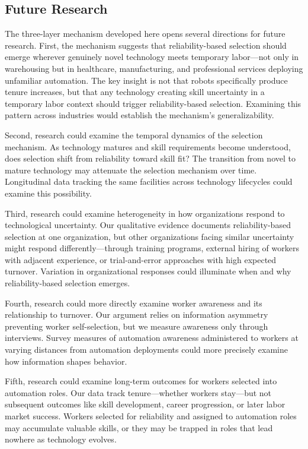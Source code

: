 \documentclass[12pt]{article}
\begin{document}
\subsection{Future Research}

The three-layer mechanism developed here opens several directions for future research. First, the mechanism suggests that reliability-based selection should emerge wherever genuinely novel technology meets temporary labor---not only in warehousing but in healthcare, manufacturing, and professional services deploying unfamiliar automation. The key insight is not that robots specifically produce tenure increases, but that any technology creating skill uncertainty in a temporary labor context should trigger reliability-based selection. Examining this pattern across industries would establish the mechanism's generalizability.

Second, research could examine the temporal dynamics of the selection mechanism. As technology matures and skill requirements become understood, does selection shift from reliability toward skill fit? The transition from novel to mature technology may attenuate the selection mechanism over time. Longitudinal data tracking the same facilities across technology lifecycles could examine this possibility.

Third, research could examine heterogeneity in how organizations respond to technological uncertainty. Our qualitative evidence documents reliability-based selection at one organization, but other organizations facing similar uncertainty might respond differently---through training programs, external hiring of workers with adjacent experience, or trial-and-error approaches with high expected turnover. Variation in organizational responses could illuminate when and why reliability-based selection emerges.

Fourth, research could more directly examine worker awareness and its relationship to turnover. Our argument relies on information asymmetry preventing worker self-selection, but we measure awareness only through interviews. Survey measures of automation awareness administered to workers at varying distances from automation deployments could more precisely examine how information shapes behavior.

Fifth, research could examine long-term outcomes for workers selected into automation roles. Our data track tenure---whether workers stay---but not subsequent outcomes like skill development, career progression, or later labor market success. Workers selected for reliability and assigned to automation roles may accumulate valuable skills, or they may be trapped in roles that lead nowhere as technology evolves.
\end{document}
